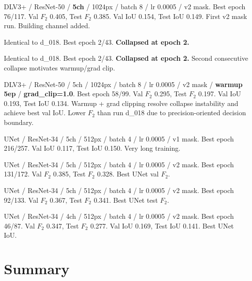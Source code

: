 \begin{description}[style=unboxed,leftmargin=0cm]
  \item[Run d\_018] DLV3+ / ResNet-50 / \textbf{5ch} / 1024px / batch 8 / lr 0.0005 / v2 mask.
    Best epoch 76/117. Val $F_2$ 0.405, Test $F_2$ 0.385. Val IoU 0.154, Test IoU 0.149. First v2 mask run. Building channel added.

  \item[Run d\_019] Identical to d\_018. Best epoch 2/43. \textbf{Collapsed at epoch 2.}

  \item[Run d\_020] Identical to d\_018. Best epoch 2/43. \textbf{Collapsed at epoch 2.} Second consecutive collapse motivates warmup/grad clip.

  \item[Run d\_024] DLV3+ / ResNet-50 / 5ch / 1024px / batch 8 / lr 0.0005 / v2 mask / \textbf{warmup 5ep} / \textbf{grad\_clip=1.0}.
    Best epoch 58/99. Val $F_2$ 0.295, Test $F_2$ 0.197. Val IoU 0.193, Test IoU 0.134. Warmup + grad clipping resolve collapse instability and achieve best val IoU. Lower $F_2$ than run d\_018 due to precision-oriented decision boundary.

  \item[Run u\_028] UNet / ResNet-34 / 5ch / 512px / batch 4 / lr 0.0005 / v1 mask.
    Best epoch 216/257. Val IoU 0.117, Test IoU 0.150. Very long training.

  \item[Run u\_029] UNet / ResNet-34 / 5ch / 512px / batch 4 / lr 0.0005 / v2 mask.
    Best epoch 131/172. Val $F_2$ 0.385, Test $F_2$ 0.328. Best UNet val $F_2$.

  \item[Run u\_030] UNet / ResNet-34 / 5ch / 512px / batch 4 / lr 0.0005 / v2 mask.
    Best epoch 92/133. Val $F_2$ 0.367, Test $F_2$ 0.341. Best UNet test $F_2$.

  \item[Run u\_031] UNet / ResNet-34 / 4ch / 512px / batch 4 / lr 0.0005 / v2 mask.
    Best epoch 46/87. Val $F_2$ 0.347, Test $F_2$ 0.277. Val IoU 0.169, Test IoU 0.141. Best UNet IoU.
\end{description}

\section{Summary}


